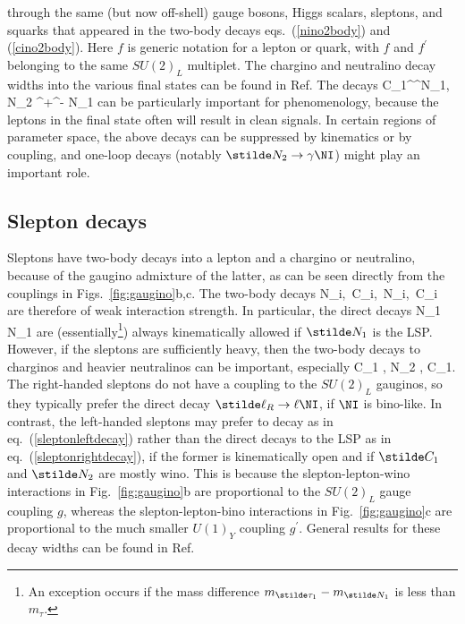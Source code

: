 \label{cino3body}
\eeq
through the same (but now off-shell) gauge bosons, Higgs scalars,
sleptons, and squarks that appeared in the two-body
decays eqs.~(\ref{nino2body}) and (\ref{cino2body}).
Here $f$ is generic notation for a lepton or quark,
with $f$ and $f^\prime$ belonging to the same $SU(2)_L$
multiplet. The chargino and neutralino decay widths into the various
final states can be found in Ref.\cite{inodecays,epluseminuscrosssections}
The decays
\beq
\stilde C_1^\pm \rightarrow \ell^\pm \nu \stilde N_1,\qquad\>\>\>
\stilde N_2 \rightarrow \ell^+\ell^- \stilde N_1
\label{trileptonbabies}
\eeq
can be particularly important for phenomenology, because the leptons in the
final state often will result in clean signals.
In certain regions of parameter space, the above decays can be suppressed
by kinematics or by coupling, and one-loop decays (notably $\stilde N_2
\rightarrow \gamma \NI$) might play an important
role.\cite{AmbrosanioMele}

\subsection{Slepton decays}\label{subsec:decays.sleptons}

Sleptons have two-body decays into a lepton and a chargino or
neutralino, because of the gaugino admixture of the latter,
as can be seen directly from the couplings in
Figs.~\ref{fig:gaugino}b,c.
The two-body decays
\beq
\stilde \ell \rightarrow \ell \stilde N_i,\>\>\,
\stilde \ell \rightarrow \nu \stilde C_i,\>\>\,
\stilde \nu \rightarrow \nu \stilde N_i,\>\>\,
\stilde \nu \rightarrow \ell \stilde C_i
\eeq
are therefore of weak interaction strength. In particular,
the direct decays
\beq
\stilde \ell \rightarrow \ell \stilde N_1
\>\>\>\>\>
\stilde \nu \rightarrow \nu \stilde N_1
\label{sleptonrightdecay}
\eeq
are (essentially\footnote{An exception
occurs if the mass difference
$m_{\stilde \tau_1} - m_{\stilde N_1}$ is less than $m_{\tau}$.}) 
always kinematically allowed if $\stilde
N_1$ is the LSP.
However, if the sleptons are sufficiently heavy, then the two-body
decays to charginos and heavier neutralinos can be important,
especially
\beq
\stilde \ell \rightarrow \nu \stilde C_{1}
,\>\>\>
\stilde \ell \rightarrow \ell \stilde N_{2}
,\>\>\>\>\>
\stilde \nu \rightarrow \ell \stilde C_{1}.
\label{sleptonleftdecay}
\eeq
The right-handed sleptons do not have a coupling to the $SU(2)_L$
gauginos, so they typically prefer the direct decay $\stilde
\ell_R \rightarrow \ell\NI$, if $\NI$ is bino-like. In contrast, the
left-handed sleptons may
prefer to decay as in eq.~(\ref{sleptonleftdecay})
rather than the direct decays to the LSP as in
eq.~(\ref{sleptonrightdecay}), if the former is kinematically open and if
$\stilde C_1$ and $\stilde N_2$ are mostly wino.
This is because the slepton-lepton-wino interactions in
Fig.~\ref{fig:gaugino}b are
proportional to the $SU(2)_L$ gauge coupling $g$,
whereas the slepton-lepton-bino interactions in Fig.~\ref{fig:gaugino}c
are
proportional to
the much smaller $U(1)_Y$ coupling $g^\prime$. General results for
these decay widths can be found in Ref.~\cite{epluseminuscrosssections}

